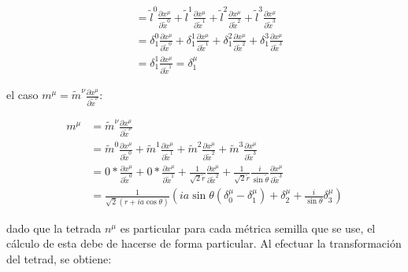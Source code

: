 \begin{enumerate}[1.]
\begin{equation}
\begin{aligned}
                        & = \tilde{l}^0 \frac{\partial x^\mu}{\partial \tilde{x}^0} + \tilde{l}^1 \frac{\partial x^\mu}{\partial \tilde{x}^1} + \tilde{l}^2 \frac{\partial x^\mu}{\partial \tilde{x}^2} + \tilde{l}^3 \frac{\partial x^\mu}{\partial \tilde{x}^3} \\
                        & = \delta_1^0 \frac{\partial x^\mu}{\partial \tilde{x}^0} + \delta_1^1 \frac{\partial x^\mu}{\partial \tilde{x}^1} + \delta_1^2 \frac{\partial x^\mu}{\partial \tilde{x}^2} + \delta_1^3 \frac{\partial x^\mu}{\partial \tilde{x}^3}     \\
                        & = \delta_1^1 \frac{\partial x^\mu}{\partial \tilde{x}^1} = \delta_1^\mu
              \end{aligned}
          \end{equation}

          el caso $m^\mu = \tilde{m}^\nu \frac{\partial x^\mu}{\partial \tilde{x}^\nu}$:

          \begin{equation}
              \begin{aligned}
                  m^\mu & = \tilde{m}^\nu \frac{\partial x^\mu}{\partial \tilde{x}^\nu}                                                                                                                                                                                                                           \\
                        & = \tilde{m}^0 \frac{\partial x^\mu}{\partial \tilde{x}^0} + \tilde{m}^1 \frac{\partial x^\mu}{\partial \tilde{x}^1} + \tilde{m}^2 \frac{\partial x^\mu}{\partial \tilde{x}^2} + \tilde{m}^3 \frac{\partial x^\mu}{\partial \tilde{x}^3}                                                 \\
                        & = 0 * \frac{\partial x^\mu}{\partial \tilde{x}^0} + 0 * \frac{\partial x^\mu}{\partial \tilde{x}^1} + \frac{1}{\sqrt{2} \tilde{r}} \frac{\partial x^\mu}{\partial \tilde{x}^2} + \frac{1}{\sqrt{2} \tilde{r}} \frac{i}{\sin \tilde{\theta}} \frac{\partial x^\mu}{\partial \tilde{x}^3} \\
                        & = \frac{1}{\sqrt{2}(r + ia \cos \theta)} \left( ia \sin \theta (\delta_0^\mu - \delta_1^\mu) + \delta_2^\mu + \frac{i}{\sin \theta} \delta_3^\mu \right)
              \end{aligned}
          \end{equation}

          dado que la tetrada $n^\mu$ es particular para cada métrica semilla que se use, el cálculo de esta debe de hacerse de forma particular. Al efectuar la transformación del tetrad, se obtiene:


\end{enumerate}

